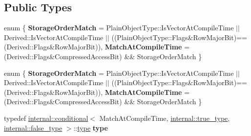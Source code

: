 \subsection*{Public Types}
\begin{DoxyCompactItemize}
\item 
\mbox{\label{struct_eigen_1_1internal_1_1traits_3_01_ref_3_01_sparse_matrix_3_01_mat_scalar_00_01_mat_optionsc6ef0ce4e339306d76a1e27f17721ded_a2297b3ea86ff453fe3f8f6dd36e4c67a}} 
enum \{ {\bfseries Storage\+Order\+Match} = Plain\+Object\+Type\+:\+:Is\+Vector\+At\+Compile\+Time $\vert$$\vert$ Derived\+:\+:Is\+Vector\+At\+Compile\+Time $\vert$$\vert$ ((Plain\+Object\+Type\+:\+:Flags\&Row\+Major\+Bit)==(Derived\+:\+:Flags\&Row\+Major\+Bit)), 
{\bfseries Match\+At\+Compile\+Time} = (Derived\+:\+:Flags\&Compressed\+Access\+Bit) \&\& Storage\+Order\+Match
 \}
\item 
\mbox{\label{struct_eigen_1_1internal_1_1traits_3_01_ref_3_01_sparse_matrix_3_01_mat_scalar_00_01_mat_optionsc6ef0ce4e339306d76a1e27f17721ded_a02c365000f56066badc83331d5243390}} 
enum \{ {\bfseries Storage\+Order\+Match} = Plain\+Object\+Type\+:\+:Is\+Vector\+At\+Compile\+Time $\vert$$\vert$ Derived\+:\+:Is\+Vector\+At\+Compile\+Time $\vert$$\vert$ ((Plain\+Object\+Type\+:\+:Flags\&Row\+Major\+Bit)==(Derived\+:\+:Flags\&Row\+Major\+Bit)), 
{\bfseries Match\+At\+Compile\+Time} = (Derived\+:\+:Flags\&Compressed\+Access\+Bit) \&\& Storage\+Order\+Match
 \}
\item 
\mbox{\label{struct_eigen_1_1internal_1_1traits_3_01_ref_3_01_sparse_matrix_3_01_mat_scalar_00_01_mat_optionsc6ef0ce4e339306d76a1e27f17721ded_a56a976fd13a3fadcc937fb3030f492f0}} 
typedef \hyperlink{struct_eigen_1_1internal_1_1conditional}{internal\+::conditional}$<$ Match\+At\+Compile\+Time, \hyperlink{struct_eigen_1_1internal_1_1true__type}{internal\+::true\+\_\+type}, \hyperlink{struct_eigen_1_1internal_1_1false__type}{internal\+::false\+\_\+type} $>$\+::\hyperlink{class_eigen_1_1internal_1_1_tensor_lazy_evaluator_writable}{type} {\bfseries type}
\item 

\end{DoxyCompactItemize}
